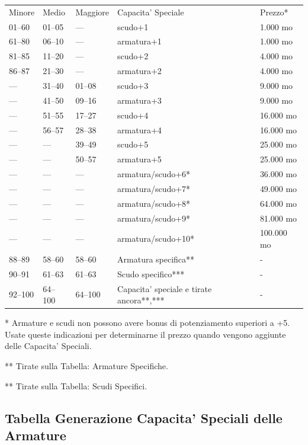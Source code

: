 \documentclass[a4paper,11pt,twoside,openany]{dndbook}
\begin{document}
{\begin{tabular}[c]{@{}lllll@{}}
\toprule 
Minore & Medio & Maggiore & Capacita' Speciale & Prezzo{*}\tabularnewline
01--60 & 01--05 & --- & scudo+1 & 1.000 mo\tabularnewline
61--80 & 06--10 & --- & armatura+1 & 1.000 mo\tabularnewline
81--85 & 11--20 & --- & scudo+2 & 4.000 mo\tabularnewline
86--87 & 21--30 & --- & armatura+2 & 4.000 mo\tabularnewline
--- & 31--40 & 01--08 & scudo+3 & 9.000 mo\tabularnewline
--- & 41--50 & 09--16 & armatura+3 & 9.000 mo\tabularnewline
--- & 51--55 & 17--27 & scudo+4 & 16.000 mo\tabularnewline
--- & 56--57 & 28--38 & armatura+4 & 16.000 mo\tabularnewline
--- & --- & 39--49 & scudo+5 & 25.000 mo\tabularnewline
--- & --- & 50--57 & armatura+5 & 25.000 mo\tabularnewline
--- & --- & --- & armatura/scudo+6{*} & 36.000 mo\tabularnewline
--- & --- & --- & armatura/scudo+7{*} & 49.000 mo\tabularnewline
--- & --- & --- & armatura/scudo+8{*} & 64.000 mo\tabularnewline
--- & --- & --- & armatura/scudo+9{*} & 81.000 mo\tabularnewline
--- & --- & --- & armatura/scudo+10{*} & 100.000 mo\tabularnewline
88--89 & 58--60 & 58--60 & Armatura specifica{*}{*} & -\tabularnewline
90--91 & 61--63 & 61--63 & Scudo specifico{*}{*}{*} & -\tabularnewline
92--100 & 64--100 & 64--100 & Capacita' speciale e tirate ancora{*}{*},{*}{*}{*} & -\tabularnewline
\bottomrule
\end{tabular}

{*} Armature e scudi non possono avere bonus di potenziamento superiori a +5. Usate queste indicazioni per determinarne il prezzo quando vengono aggiunte delle Capacita' Speciali.

{*}{*} Tirate sulla Tabella: Armature Specifiche.

{*}{*} Tirate sulla Tabella: Scudi Specifici.



\subsection{Tabella Generazione Capacita' Speciali delle Armature}

\label{tabella-generazione-capacita-speciali-delle-armature}

}
\end{document}
